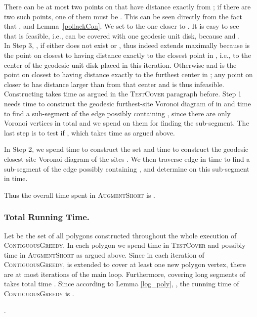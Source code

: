 \documentclass{llncs}
\begin{document}
There can be at most two points on  that have distance exactly  from ; if there are two such points, one of them must be .  This can be seen directly from the fact that , and Lemma~\ref{pollackCon}.  We set  to the one closer to . It is easy to see that  is feasible, i.e.,  can be covered with one geodesic unit disk, because  and .\\

In Step 3, , if either  does not exist or , thus   indeed extends  maximally because  is the point on  closest to  having distance exactly  to the closest point in , i.e., to the center of the geodesic unit disk placed in this iteration. Otherwise  and  is the point on  closest to  having distance exactly  to the furthest center in ; any point on  closer to  has distance larger than  from that center and is thus infeasible.\\


Constructing  takes time  as argued in the \textsc{TestCover} paragraph before.
Step 1 needs  time to construct the geodesic furthest-site Voronoi diagram of  in  and   time to find a sub-segment of the edge  possibly containing , since there are only  Voronoi vertices in total and we spend  on them for finding the sub-segment. The last step is to test if , which takes time  as argued above.

In Step 2, we spend  time to construct the set  and  time to construct the geodesic closest-site Voronoi diagram of the sites . We then traverse edge  in  time to find a sub-segment of the edge  possibly containing , and determine  on this sub-segment in  time.

Thus the overall time spent in \textsc{AugmentShort}  is .

\subsubsection{Total Running Time.}

Let  be the set of all polygons constructed throughout the whole execution of \textsc{ContiguousGreedy}. In each polygon  we spend  time in \textsc{TestCover} and possibly  time in \textsc{AugmentShort} as argued above. Since in each iteration of \textsc{ContiguousGreedy},  is extended to cover at least one new polygon vertex, there are at most  iterations of the main  loop. Furthermore,  covering long segments of  takes total time . Since according to Lemma \ref{log_poly}, , the running time of \textsc{ContiguousGreedy} is . 
\vspace{5pt}
\begin{lemma}
.
\label{log_poly}
\end{lemma}
\end{document}
